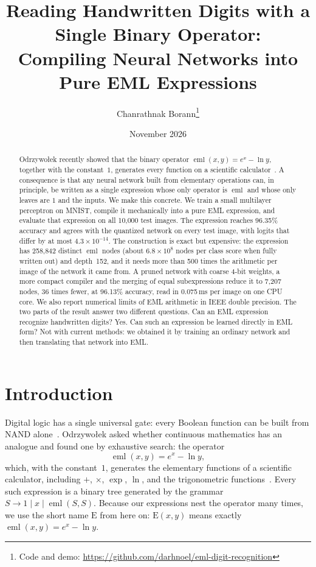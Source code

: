 \documentclass[11pt]{article}
\title{Reading Handwritten Digits with a Single Binary Operator:\\
Compiling Neural Networks into Pure EML Expressions}
\author{Chanrathnak Borann\thanks{Code and demo: \url{https://github.com/darhnoel/eml-digit-recognition}}}
\date{November 2026}
\newcommand{\eml}{\operatorname{eml}}
\newcommand{\E}{\mathrm{E}}
\begin{document}
\maketitle

\begin{abstract}
Odrzywołek recently showed that the binary operator
$\eml(x,y)=e^{x}-\ln y$, together with the constant~$1$, generates every
function on a scientific calculator~\cite{odrzywolek2026}. A consequence is
that any neural network built from elementary operations can, in principle,
be written as a single expression whose only operator is $\eml$ and whose only
leaves are $1$ and the inputs. We make this concrete. We train a small
multilayer perceptron on MNIST, compile it mechanically into a pure EML
expression, and evaluate that expression on all 10{,}000 test images. The
expression reaches 96.35\% accuracy and agrees with the quantized network on
every test image, with logits that differ by at most $4.3\times10^{-14}$.
The construction is exact but expensive: the expression has 258{,}842
distinct $\eml$ nodes (about $6.8\times10^{8}$ nodes per class score when
fully written out) and depth~152, and it needs more than 500 times the arithmetic per image
of the network it came from. A pruned network with coarse 4-bit weights, a
more compact compiler and the merging of equal subexpressions reduce it to
7{,}207 nodes, 36 times fewer, at 96.13\% accuracy, read in 0.075\,ms per
image on one CPU core. We also
report numerical limits of EML arithmetic in IEEE double precision. The two parts of the result answer
two different questions. Can an EML expression recognize handwritten digits?
Yes. Can such an expression be learned directly in EML form? Not with current
methods: we obtained it by training an ordinary network and then translating
that network into EML.
\end{abstract}

\section{Introduction}

Digital logic has a single universal gate: every Boolean function can be
built from NAND alone~\cite{sheffer1913}. Odrzywołek asked whether continuous
mathematics has an analogue and found one by exhaustive search: the operator
\begin{equation}
  \eml(x,y) = e^{x} - \ln y ,
\end{equation}
which, with the constant~$1$, generates the elementary functions of a
scientific calculator, including $+$, $\times$, $\exp$, $\ln$, and the
trigonometric functions~\cite{odrzywolek2026}. Every such expression is a
binary tree generated by the grammar $S \to 1 \mid x \mid \eml(S,S)$.
Because our expressions nest the operator many times, we use the short name
$\E$ from here on: $\E(x,y)$ means exactly $\eml(x,y)=e^{x}-\ln y$.
\end{document}
